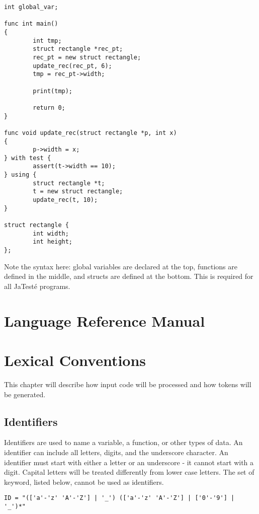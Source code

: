 \documentclass{article}
\begin{document}
\begin{enumerate}
\begin{lstlisting}
int global_var;

func int main()
{
        int tmp;
        struct rectangle *rec_pt;
        rec_pt = new struct rectangle;
        update_rec(rec_pt, 6);
        tmp = rec_pt->width;

        print(tmp);

        return 0;
}

func void update_rec(struct rectangle *p, int x)
{
        p->width = x;
} with test {
        assert(t->width == 10);
} using {
        struct rectangle *t;
        t = new struct rectangle;
        update_rec(t, 10);
}

struct rectangle {
        int width;
        int height;
};
\end{lstlisting}
Note the syntax here: global variables are declared at the top, functions are defined in the middle, and structs are defined at the bottom. This is required for all  JaTest\'{e} programs. 
\end{enumerate}

\newpage

\section*{Language Reference Manual}

\section{Lexical Conventions}
This chapter will describe how input code will be processed and how tokens will be generated.

\subsection{Identifiers}
Identifiers are used to name a variable, a function, or other types of data.  An identifier can include all letters, digits, and the underscore character.  An identifier must start with either a letter or an underscore - it cannot start with a digit.  Capital letters will be treated differently from lower case letters. The set of keyword, listed below, cannot be used as identifiers. 

\begin{Verbatim}[frame=single]
ID = "(['a'-'z' 'A'-'Z'] | '_') (['a'-'z' 'A'-'Z'] | ['0'-'9'] | '_')*"
\end{Verbatim}
\end{document}
